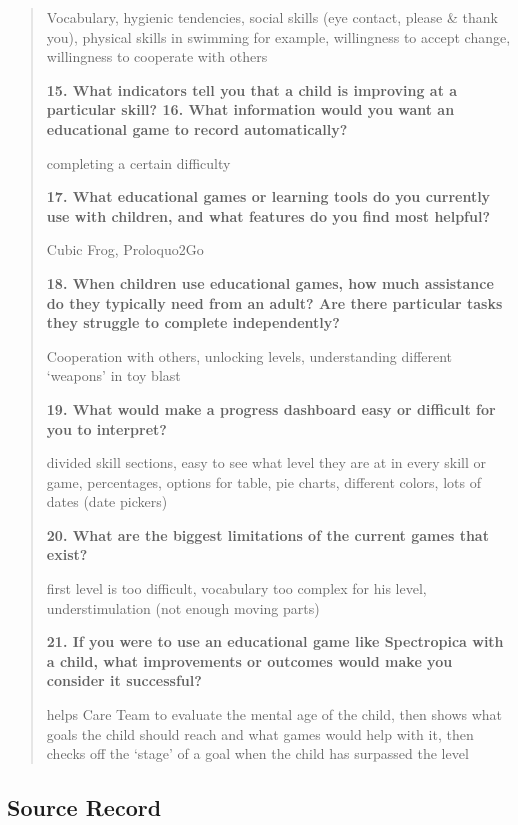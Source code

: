\documentclass[12pt, titlepage]{article}
\begin{document}
\begin{quote}
\noindent Vocabulary, hygienic tendencies, social skills (eye contact, please \& thank you), physical skills in swimming for example, willingness to accept change, willingness to cooperate with others

\noindent\textbf{15. What indicators tell you that a child is improving at a particular skill? 16. What information would you want an educational game to record automatically?}

\noindent completing a certain difficulty

\noindent\textbf{17. What educational games or learning tools do you currently use with children, and what features do you find most helpful?}

\noindent Cubic Frog, Proloquo2Go

\noindent\textbf{18. When children use educational games, how much assistance do they typically need from an adult? Are there particular tasks they struggle to complete independently?}

\noindent Cooperation with others, unlocking levels, understanding different ‘weapons’ in toy blast

\noindent\textbf{19. What would make a progress dashboard easy or difficult for you to interpret?}

\noindent divided skill sections, easy to see what level they are at in every skill or game, percentages, options for table, pie charts, different colors, lots of dates (date pickers)

\noindent\textbf{20. What are the biggest limitations of the current games that exist?}

\noindent first level is too difficult, vocabulary too complex for his level, understimulation (not enough moving parts)

\noindent\textbf{21. If you were to use an educational game like Spectropica with a child, what improvements or outcomes would make you consider it successful?}

\noindent helps Care Team to evaluate the mental age of the child, then shows what goals the child should reach and what games would help with it, then checks off the ‘stage’ of a goal when the child has surpassed the level

\end{quote}

\subsection{Source Record}
\end{document}
